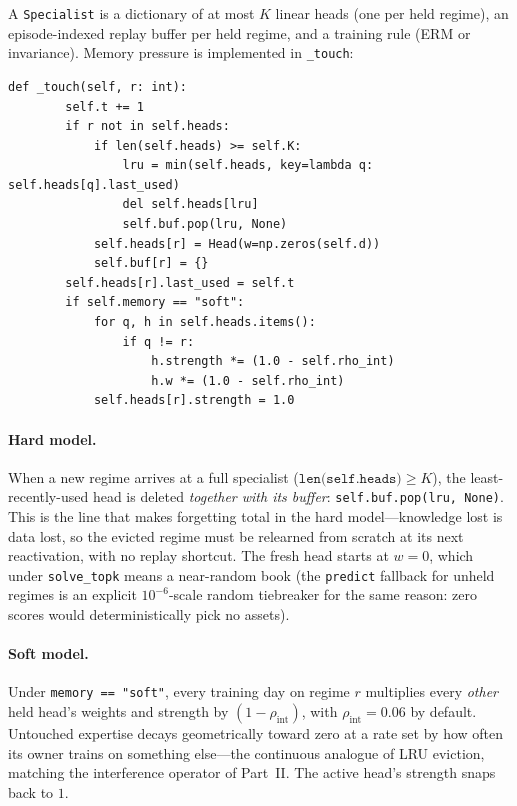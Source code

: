 A \texttt{Specialist} is a dictionary of at most $K$ linear heads (one per
held regime), an episode-indexed replay buffer per held regime, and a
training rule (ERM or invariance). Memory pressure is implemented in
\texttt{\_touch}:

\begin{lstlisting}[caption={Memory bookkeeping: hard LRU and soft interference (\texttt{risp.py}).},label={lst:dd6-touch}]
    def _touch(self, r: int):
        self.t += 1
        if r not in self.heads:
            if len(self.heads) >= self.K:
                lru = min(self.heads, key=lambda q: self.heads[q].last_used)
                del self.heads[lru]
                self.buf.pop(lru, None)
            self.heads[r] = Head(w=np.zeros(self.d))
            self.buf[r] = {}
        self.heads[r].last_used = self.t
        if self.memory == "soft":
            for q, h in self.heads.items():
                if q != r:
                    h.strength *= (1.0 - self.rho_int)
                    h.w *= (1.0 - self.rho_int)
            self.heads[r].strength = 1.0
\end{lstlisting}

\paragraph{Hard model.} When a new regime arrives at a full specialist
($\texttt{len(self.heads)} \ge K$), the least-recently-used head is deleted
\emph{together with its buffer}: \texttt{self.buf.pop(lru, None)}. This is
the line that makes forgetting total in the hard model---knowledge lost is
data lost, so the evicted regime must be relearned from scratch at its next
reactivation, with no replay shortcut. The fresh head starts at
$w = 0$, which under \texttt{solve\_topk} means a near-random book (the
\texttt{predict} fallback for unheld regimes is an explicit
$10^{-6}$-scale random tiebreaker for the same reason: zero scores would
deterministically pick no assets).

\paragraph{Soft model.} Under \texttt{memory == "soft"}, every training day
on regime $r$ multiplies every \emph{other} held head's weights and strength
by $(1 - \rho_{\mathrm{int}})$, with $\rho_{\mathrm{int}} = 0.06$ by
default. Untouched expertise decays geometrically toward zero at a rate set
by how often its owner trains on something else---the continuous analogue of
LRU eviction, matching the interference operator of Part~II. The active
head's strength snaps back to $1$.


